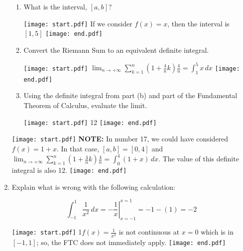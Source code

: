 \documentclass[12pt]{article}
\begin{document}
\begin{enumerate}
\begin{enumerate}

\item What is the interval, $[a,b]$?

\texttt{[image: start.pdf]}
{{If we consider $f(x)=x$, then the interval is $[1,5]$}}
\texttt{[image: end.pdf]}


\item Convert the Riemann Sum to an equivalent definite integral.

\texttt{[image: start.pdf]}
{{$\lim_{n \rightarrow +\infty} \sum_{k=1}^n{\left(1+\frac{4}{n}k\right)\frac{4}{n}}=\int_1^5{x} \,dx$}}
\texttt{[image: end.pdf]}


\item Using the definite integral from part (b) and part of the Fundamental Theorem of Calculus, evaluate the limit.

\texttt{[image: start.pdf]}
{{12}}
\texttt{[image: end.pdf]}


\end{enumerate}

\texttt{[image: start.pdf]}
{{\bf NOTE:} In number 17, we could have considered $f(x)=1+x$.  In that case, $[a,b]=[0,4]$ and $\lim_{n \rightarrow +\infty} \sum_{k=1}^n{\left(1+\frac{4}{n}k\right)\frac{4}{n}}=\int_0^4{(1+x)} \,dx$.  The value of this definite integral is also 12.}
\texttt{[image: end.pdf]}


\item Explain what is wrong with the following calculation:

$$\int_{-1}^1 \frac{1}{x^2} \,dx =\left. -\frac{1}{x}\right|_{x=-1}^{x=1}=-1-(1)=-2$$

\texttt{[image: start.pdf]}
{{{1\linewidth}{$f(x)=\frac{1}{x^2}$ is not continuous at $x=0$ which is in $[-1,1]$; so, the FTC does not immediately apply.}}}
\texttt{[image: end.pdf]}


\end{enumerate}

\end{document}
